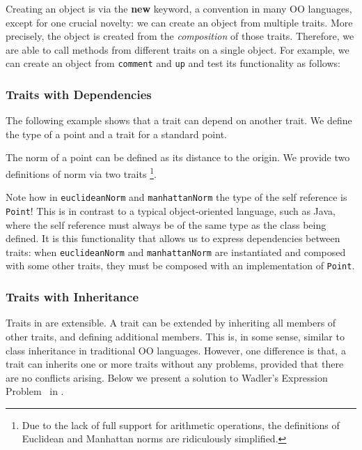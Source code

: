 Creating an object is via the \textbf{new} keyword, a convention in many OO
languages, except for one crucial novelty: we can create an object from multiple
traits. More precisely, the object is created from the \textit{composition} of
those traits. Therefore, we are able to call methods from different traits on a
single object. For example, we can create an object from \lstinline$comment$ and
\lstinline$up$ and test its functionality as follows:


\subsubsection{Traits with Dependencies}

The following example shows that a trait can depend on another trait. We define
the type of a point and a trait for a standard point.


The norm of a point can be defined as its distance to the origin. We provide two
definitions of norm via two traits \footnote{Due to the lack of full support for
  arithmetic operations, the definitions of Euclidean and Manhattan norms are
  ridiculously simplified. }.


Note how in \lstinline$euclideanNorm$ and \lstinline$manhattanNorm$ the type of
the self reference is \lstinline$Point$! This is in contrast to a typical
object-oriented language, such as Java, where the self reference must always be
of the same type as the class being defined. It is this functionality that
allows us to express dependencies between traits: when \lstinline$euclideanNorm$
and \lstinline$manhattanNorm$ are instantiated and composed with some other
traits, they must be composed with an implementation of \lstinline$Point$.




\subsubsection{Traits with Inheritance}

Traits in \name are extensible. A trait can be extended by inheriting all
members of other traits, and defining additional members. This is, in some
sense, similar to class inheritance in traditional OO languages. However, one
difference is that, a trait can inherits one or more traits without any
problems, provided that there are no conflicts arising. Below we present a
solution to Wadler's Expression Problem~\cite{wadler1998expression} in \name.

